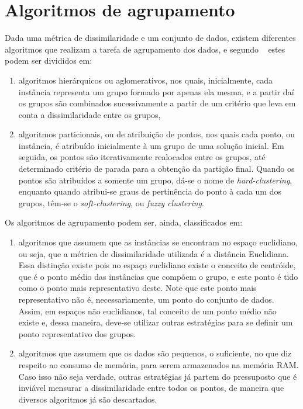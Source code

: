\section{Algoritmos de agrupamento}

Dada uma métrica de dissimilaridade e um conjunto de dados, existem diferentes algoritmos que realizam a tarefa de agrupamento dos dados, e segundo ~\parencite[][243]{Ullman} estes podem ser divididos em:

\begin{enumerate}
	\item  algoritmos hierárquicos ou aglomerativos, nos quais, inicialmente, cada instância representa um grupo formado por apenas ela mesma, e a partir daí os grupos são combinados sucessivamente a partir de um critério que leva em conta a dissimilaridade entre os grupos,
	\item algoritmos particionais, ou de atribuição de pontos, nos quais cada ponto, ou instância, é atribuído inicialmente à um grupo de uma solução inicial. Em seguida, os pontos são iterativamente realocados entre os grupos, até determinado critério de parada para a obtenção da partição final. Quando os pontos são atribuídos a somente um grupo, dá-se o nome de \emph{hard-clustering}, enquanto quando atribui-se graus de pertinência do ponto à cada um dos grupos, têm-se o \emph{soft-clustering}, ou \emph{fuzzy clustering}.
\end{enumerate}
Os algoritmos de agrupamento podem ser, ainda, classificados em:

\begin{enumerate}
	\item algoritmos que assumem que as instâncias se encontram no espaço euclidiano, ou seja, que a métrica de dissimilaridade utilizada é a distância Euclidiana. Essa distinção existe pois no espaço euclidiano existe o conceito de centróide, que é o ponto médio das instâncias que compõem o grupo, e este ponto é tido como o ponto mais representativo deste. Note que este ponto mais representativo não é, necessariamente, um ponto do conjunto de dados. Assim, em espaços não euclidianos, tal conceito de um ponto médio não existe e, dessa maneira, deve-se utilizar outras estratégias para se definir um ponto representativo dos grupos.
	\item algoritmos que assumem que os dados são pequenos, o suficiente, no que diz respeito ao consumo de memória, para serem armazenados na memória RAM. Caso isso não seja verdade, outras estratégias já partem do pressuposto que é inviável mensurar a dissimilaridade entre todos os pontos, de maneira que diversos algoritmos já são descartados. 
\end{enumerate}

